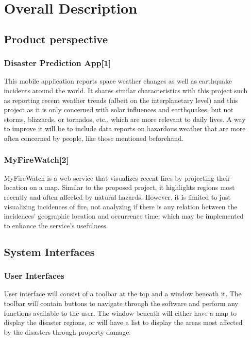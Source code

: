 \documentclass{article}
\begin{document}
  
\section{Overall Description}
\subsection{Product perspective}
\subsubsection*{Disaster Prediction App[1]} 
    This mobile application reports space weather changes as well as earthquake 
    incidents around the world. It shares similar characteristics with this project 
    such as reporting recent weather trends (albeit on the interplanetary level) and 
    this project as it is only concerned with solar influences and earthquakes, but 
    not storms, blizzards, or tornados, etc., which are more relevant to daily lives. 
    A way to improve it will be to include data reports on hazardous weather that are 
    more often concerned by people, like those mentioned beforehand.
 
\subsubsection*{MyFireWatch[2]} 
    MyFireWatch is a web service that visualizes recent fires by projecting their 
    location on a map. Similar to the proposed project, it highlights regions most 
    recently and often affected by natural hazards. However, it is limited to just 
    visualizing incidences of fire, not analyzing if there is any relation between 
    the incidences’ geographic location and occurrence time, which may be implemented 
    to enhance the service’s usefulness.

 
    \subsection{System Interfaces}
	\subsubsection{User Interfaces}
    User interface will consist of a toolbar at the top and a window beneath it. 
    The toolbar will contain buttons to navigate through the software and perform 
    any functions available to the user. The window beneath will either have a map to 
    display the disaster regions, or will have a list to display the areas most 
    affected by the disasters through property damage.
 
\end{document}
